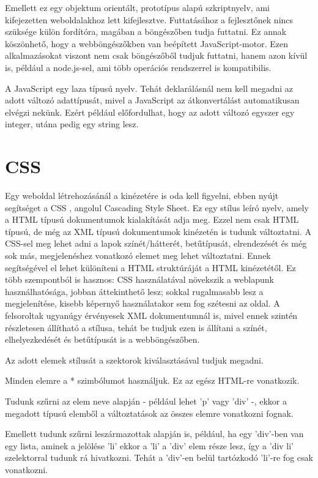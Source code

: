  Emellett ez egy objektum orientált, prototípus alapú szkriptnyelv, ami kifejezetten weboldalakhoz lett kifejlesztve. Futtatásához a fejlesztőnek nincs szüksége külön fordítóra, magában a böngészőben tudja futtatni. Ez annak köszönhető, hogy a webböngészőkben van beépített JavaScript-motor. Ezen alkalmazásokat viszont nem csak böngészőből tudjuk futtatni, hanem azon kívül is, például a node.js-sel, ami több operációs rendszerrel is kompatibilis.
 
A JavaScript egy laza típusú nyelv. Tehát deklarálásnál nem kell megadni az adott változó adattípusát, mivel a JavaScript az átkonvertálást automatikusan elvégzi nekünk. Ezért például előfordulhat, hogy az adott változó egyszer egy integer, utána pedig egy string lesz.


\section{CSS}

Egy weboldal létrehozásánál a kinézetére is oda kell figyelni, ebben nyújt segítséget a CSS \cite{3}, angolul Cascading Style Sheet. Ez egy stílus leíró nyelv, amely a HTML típusú dokumentumok kialakítását adja meg. Ezzel nem csak HTML típusú, de még az XML típusú dokumentumok kinézetén is tudunk változtatni. A CSS-sel meg lehet adni a lapok színét/hátterét, betűtípusát, elrendezését és még sok más, megjelenéshez vonatkozó elemet meg lehet változtatni. Ennek segítségével el lehet különíteni a HTML struktúráját a HTML kinézetétől. Ez több szempontból is hasznos: CSS használatával növekszik a weblapunk használhatósága, jobban áttekinthető lesz; sokkal rugalmasabb lesz a megjelenítése, kisebb képernyő használatakor sem fog szétesni az oldal. A felsoroltak ugyanúgy érvényesek XML dokumentumnál is, mivel ennek szintén részletesen állítható a stílusa, tehát be tudjuk ezen is állítani a színét, elhelyezkedését és betűtípusát is a webböngészőben.

Az adott elemek stílusát a szektorok kiválasztásával tudjuk megadni.

Minden elemre a * szimbólumot használjuk. Ez az egész HTML-re vonatkozik. 

Tudunk szűrni az elem neve alapján - például lehet ’p’ vagy ’div’ -, ekkor a megadott típusú elemből a változtatások az összes elemre vonatkozni fognak. 

Emellett tudunk szűrni leszármazottak alapján is, például, ha egy ’div’-ben van egy lista, aminek a jelölése ’li’ ekkor a ’li’ a ’div’ elem része lesz, így a ’div li’ szelektorral tudunk rá hivatkozni. Tehát a ’div’-en belül tartózkodó ’li’-re fog csak vonatkozni.

